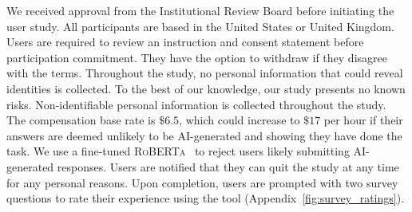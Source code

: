 We received approval from the Institutional Review Board before initiating the user study. 
%
All participants are based in the United States or United Kingdom. 
%
Users are required to review an instruction and consent statement before participation commitment. 
%
They have the option to withdraw if they disagree with the terms. Throughout the study, no personal information that could reveal identities is collected. To the best of our knowledge, our study presents no known risks.
%
Non-identifiable personal information is collected throughout the study.
%
The compensation base rate is
$\$6.5$, which could increase to $\$17$ per hour if their answers are
deemed unlikely to be AI-generated and showing they have done the
task. 
%
We use a fine-tuned \textsc{RoBERTa}~\cite{sivesind_2023, zhou2024teachingassistantintheloopimprovingknowledgedistillation} to
reject users likely submitting AI-generated responses.
%
Users are notified that they can quit the study at any time for any personal reasons.
%
Upon completion, users are prompted with two survey questions to rate
their experience using the tool (Appendix~\ref{fig:survey_ratings}).
%
